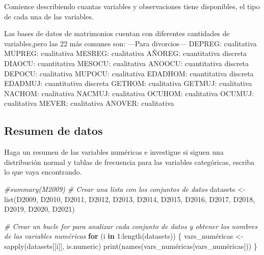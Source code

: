\documentclass[
]{article}
\newenvironment{Shaded}{\begin{snugshade}}{\end{snugshade}}
\newcommand{\CommentTok}[1]{\textcolor[rgb]{0.56,0.35,0.01}{\textit{#1}}}
\newcommand{\ControlFlowTok}[1]{\textcolor[rgb]{0.13,0.29,0.53}{\textbf{#1}}}
\newcommand{\DecValTok}[1]{\textcolor[rgb]{0.00,0.00,0.81}{#1}}
\newcommand{\FunctionTok}[1]{\textcolor[rgb]{0.00,0.00,0.00}{#1}}
\newcommand{\NormalTok}[1]{#1}
\newcommand{\OtherTok}[1]{\textcolor[rgb]{0.56,0.35,0.01}{#1}}
\newcommand{\SpecialCharTok}[1]{\textcolor[rgb]{0.00,0.00,0.00}{#1}}
\begin{document}
Comience describiendo cuantas variables y observaciones tiene
disponibles, el tipo de cada una de las variables.

Las bases de datos de matrimonios cuentan con diferentes cantidades de
variables,pero las 22 más comunes son: ---Para divorcios--- DEPREG:
cualitativa MUPREG: cualitativa MESREG: cualitativa AÑOREG: cuantitativa
discreta DIAOCU: cuantitativa MESOCU: cualitativa ANOOCU: cuantitativa
discreta DEPOCU: cualitativa MUPOCU: cualitativa EDADHOM: cuantitativa
discreta EDADMUJ: cuantitativa discreta GETHOM: cualitativa GETMUJ:
cualitativa NACHOM: cualitativa NACMUJ: cualitativa OCUHOM: cualitativa
OCUMUJ: cualitativa MEVER: cualitativa ANOVER: cualitativa

\hypertarget{resumen-de-datos}{%
\subsection{Resumen de datos}\label{resumen-de-datos}}

Haga un resumen de las variables numéricas e investigue si siguen una
distribución normal y tablas de frecuencia para las variables
categóricas, escriba lo que vaya encontrando.

\begin{Shaded}
\begin{Highlighting}[]
\CommentTok{\#summary(M2009)}
\CommentTok{\# Crear una lista con los conjuntos de datos}
\NormalTok{datasets }\OtherTok{\textless{}{-}} \FunctionTok{list}\NormalTok{(D2009, D2010, D2011, D2012, D2013, D2014, D2015, D2016, D2017, D2018, D2019, D2020, D2021)}

\CommentTok{\# Crear un bucle for para analizar cada conjunto de datos y obtener los nombres de las variables numéricas}
\ControlFlowTok{for}\NormalTok{ (i }\ControlFlowTok{in} \DecValTok{1}\SpecialCharTok{:}\FunctionTok{length}\NormalTok{(datasets)) \{}
\NormalTok{  vars\_numéricas }\OtherTok{\textless{}{-}} \FunctionTok{sapply}\NormalTok{(datasets[[i]], is.numeric)}
  \FunctionTok{print}\NormalTok{(}\FunctionTok{names}\NormalTok{(vars\_numéricas[vars\_numéricas]))}
\NormalTok{\}}
\end{Highlighting}
\end{Shaded}
\end{document}
